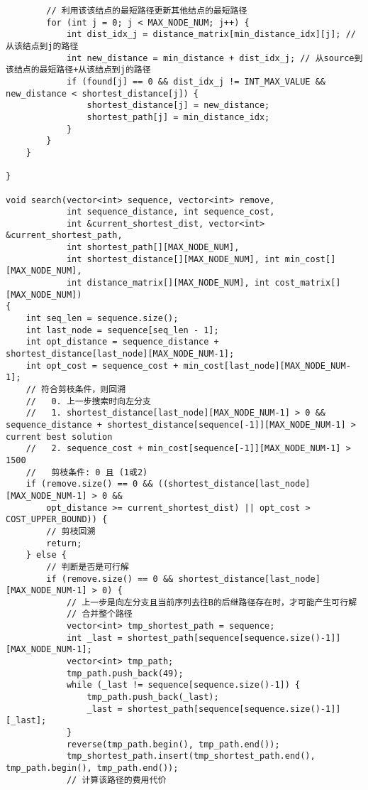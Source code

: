 \documentclass{article}
\begin{document}
\begin{lstlisting}
        // 利用该该结点的最短路径更新其他结点的最短路径
        for (int j = 0; j < MAX_NODE_NUM; j++) {
            int dist_idx_j = distance_matrix[min_distance_idx][j]; // 从该结点到j的路径
            int new_distance = min_distance + dist_idx_j; // 从source到该结点的最短路径+从该结点到j的路径
            if (found[j] == 0 && dist_idx_j != INT_MAX_VALUE && new_distance < shortest_distance[j]) {
                shortest_distance[j] = new_distance;
                shortest_path[j] = min_distance_idx;
            }
        }
    }

}

void search(vector<int> sequence, vector<int> remove,
            int sequence_distance, int sequence_cost,
            int &current_shortest_dist, vector<int> &current_shortest_path,
            int shortest_path[][MAX_NODE_NUM],
            int shortest_distance[][MAX_NODE_NUM], int min_cost[][MAX_NODE_NUM],
            int distance_matrix[][MAX_NODE_NUM], int cost_matrix[][MAX_NODE_NUM])
{
    int seq_len = sequence.size();
    int last_node = sequence[seq_len - 1];
    int opt_distance = sequence_distance + shortest_distance[last_node][MAX_NODE_NUM-1];
    int opt_cost = sequence_cost + min_cost[last_node][MAX_NODE_NUM-1];
    // 符合剪枝条件，则回溯
    //   0. 上一步搜索时向左分支
    //   1. shortest_distance[last_node][MAX_NODE_NUM-1] > 0 && sequence_distance + shortest_distance[sequence[-1]][MAX_NODE_NUM-1] > current best solution
    //   2. sequence_cost + min_cost[sequence[-1]][MAX_NODE_NUM-1] > 1500
    //   剪枝条件: 0 且 (1或2)
    if (remove.size() == 0 && ((shortest_distance[last_node][MAX_NODE_NUM-1] > 0 &&
        opt_distance >= current_shortest_dist) || opt_cost > COST_UPPER_BOUND)) {
        // 剪枝回溯
        return;
    } else {
        // 判断是否是可行解
        if (remove.size() == 0 && shortest_distance[last_node][MAX_NODE_NUM-1] > 0) {
            // 上一步是向左分支且当前序列去往B的后继路径存在时，才可能产生可行解
            // 合并整个路径
            vector<int> tmp_shortest_path = sequence;
            int _last = shortest_path[sequence[sequence.size()-1]][MAX_NODE_NUM-1];
            vector<int> tmp_path;
            tmp_path.push_back(49);
            while (_last != sequence[sequence.size()-1]) {
                tmp_path.push_back(_last);
                _last = shortest_path[sequence[sequence.size()-1]][_last];
            }
            reverse(tmp_path.begin(), tmp_path.end());
            tmp_shortest_path.insert(tmp_shortest_path.end(), tmp_path.begin(), tmp_path.end());
            // 计算该路径的费用代价

\end{lstlisting}
\end{document}
